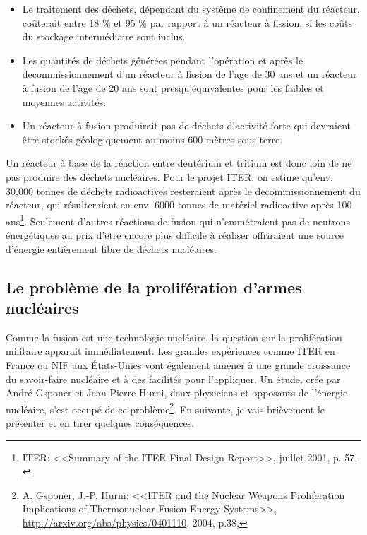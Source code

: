 \documentclass[12pt,a4paper]{article}
\begin{document}
\begin{itemize}
\item Le traitement des déchets, dépendant du système de confinement du réacteur, coûterait entre 18 \% et 95 \% par rapport à un réacteur à fission, si les coûts du stockage intermédiaire sont inclus.
\item Les quantités de déchets générées pendant l'opération et après le decommissionnement d'un réacteur à fission de l'age de 30 ans et un réacteur à fusion de l'age de 20 ans sont presqu'équivalentes pour les faibles et moyennes activités.
\item Un réacteur à fusion produirait pas de déchets d'activité forte qui devraient être stockés géologiquement au moins 600 mètres sous terre.
\end{itemize}

Un réacteur à base de la réaction entre deutérium et tritium est donc loin de ne pas produire des déchets nucléaires. Pour le projet ITER, on estime qu'env. 30,000 tonnes de déchets radioactives resteraient après le decommissionnement du réacteur, qui résulteraient en env. 6000 tonnes de matériel radioactive après 100 ans\footnote{ITER: <<Summary of the
ITER
Final Design Report>>, juillet 2001, p. 57, \cite{itersafety}}. Seulement d'autres réactions de fusion qui n'emmétraient pas de neutrons énergétiques au prix d'être encore plus difficile à réaliser offriraient une source d'énergie entièrement libre de déchets nucléaires. 

\subsection{Le problème de la prolifération d'armes nucléaires}
Comme la fusion est une technologie nucléaire, la question sur la prolifération militaire apparait immédiatement. Les grandes expériences comme ITER en France ou NIF aux États-Unies vont également amener à une grande croissance du savoir-faire nucléaire et à des facilités pour l'appliquer. Un étude, crée par André Gsponer et Jean-Pierre Hurni, deux physiciens et opposants de l'énergie nucléaire, s'est occupé de ce problème\footnote{A. Gsponer, J.-P.
Hurni: <<ITER and the Nuclear Weapons Proliferation Implications
of Thermonuclear Fusion
Energy Systems>>, \url{http://arxiv.org/abs/physics/0401110}, 2004, p.38,\cite{gsponer}}. En suivante, je vais brièvement le présenter et en tirer quelques conséquences.
\end{document}
